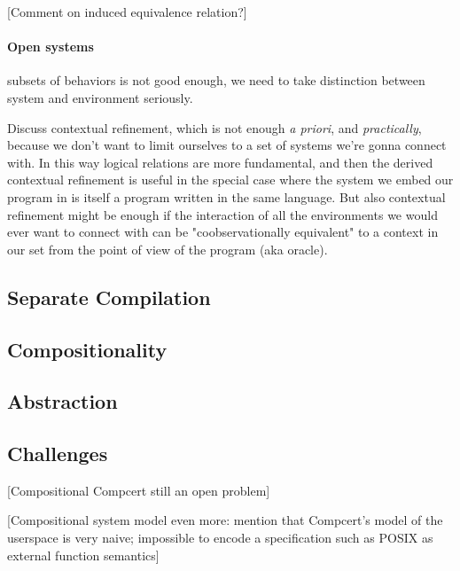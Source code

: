 \documentclass[sigplan,10pt,review,anonymous]{acmart}
\begin{document}
[Comment on induced equivalence relation?]

\paragraph{Open systems}

subsets of behaviors is not good enough,
we need to take distinction between system and environment seriously.

Discuss contextual refinement,
which is not enough \emph{a priori}, and \emph{practically},
because we don't want to limit ourselves to a set of systems we're gonna connect with.
In this way logical relations are more fundamental,
and then the derived contextual refinement is useful
in the special case where the system we embed our program in
is itself a program written in the same language.
But also contextual refinement might be enough
if the interaction of all the environments we would ever want to connect with
can be "coobservationally equivalent" to a context in our set
from the point of view of the program (aka oracle).


\subsection{Separate Compilation} %


\subsection{Compositionality} %


\subsection{Abstraction} %


\subsection{Challenges} %

[Compositional Compcert still an open problem]

[Compositional system model even more:
mention that Compcert's model of the userspace is very naive;
impossible to encode a specification such as POSIX
as external function semantics]

\end{document}
